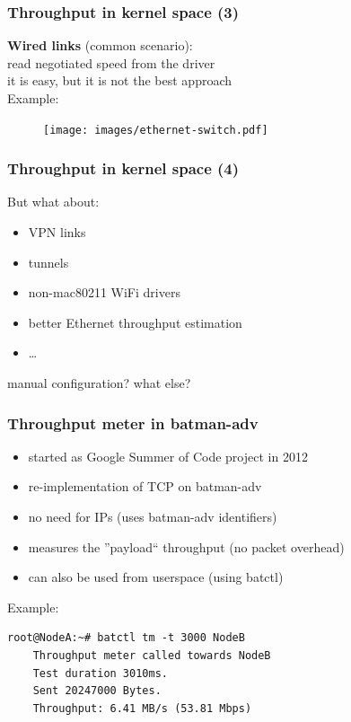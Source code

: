 \documentclass[slidestop]{beamer}
\begin{document}
\begin{frame}[c]
	\frametitle{Throughput in kernel space (3)}
	\begin{center}
	\textbf{Wired links} (common scenario):\\
	read negotiated speed from the driver\\[0.5cm]
	\pause
	it is easy, but it is not the best approach\\[0.3cm]
	Example:
	\begin{figure}
		\centering
		\texttt{[image: images/ethernet-switch.pdf]}
	\end{figure}
	\end{center}
\end{frame}

\begin{frame}[c]
	\frametitle{Throughput in kernel space (4)}
	But what about:
	\begin{itemize}
	\item VPN links
	\item tunnels
	\item non-mac80211 WiFi drivers
	\item better Ethernet throughput estimation
	\item \dots
	\end{itemize}
	manual configuration? what else?
\end{frame}

\begin{frame}[c,fragile]
	\frametitle{Throughput meter in batman-adv}
	\begin{itemize}
		\item started as Google Summer of Code project in 2012
		\item re-implementation of TCP on batman-adv
		\item no need for IPs (uses batman-adv identifiers)
		\item measures the ''payload`` throughput (no packet overhead)
		\item can also be used from userspace (using batctl)
	\end{itemize}
	\addvspace{0.5cm}
	Example:\\
	\begin{lstlisting}[basicstyle=\scriptsize]
	root@NodeA:~# batctl tm -t 3000 NodeB
	Throughput meter called towards NodeB
	Test duration 3010ms.
	Sent 20247000 Bytes.
	Throughput: 6.41 MB/s (53.81 Mbps)
	\end{lstlisting}
\end{frame}
\end{document}
